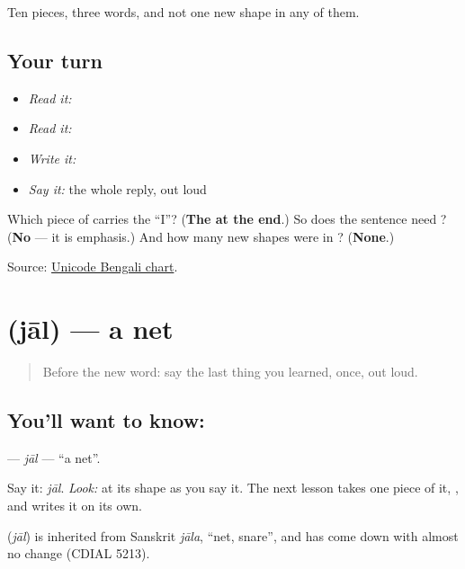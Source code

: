 Ten pieces, three words, and not one new shape in any of them.

\subsection*{Your turn}
\begin{itemize}
\raggedright
  \item \emph{Read it:} 
  \item \emph{Read it:}   
  \item \emph{Write it:} 
  \item \emph{Say it:} the whole reply, out loud
\end{itemize}

\begin{tcolorbox}[breakable,colback=teal!4,colframe=teal!35!black,title={Before you move on}]
Which piece of \textbf{} carries the \textquotedblleft{}I\textquotedblright{}? (\textbf{The  at the end}.) So does the sentence need \textbf{}? (\textbf{No} — it is emphasis.) And how many new shapes were in \textbf{  }? (\textbf{None}.)

Source: \href{https://www.unicode.org/charts/PDF/U0980.pdf}{Unicode Bengali chart}.
\end{tcolorbox}
\section[\texorpdfstring{\bn{জাল} (jāl)}{জাল (jāl)}]{ (jāl) — a net}

\label{lesson:BN-C09-jal}



\begin{quote}
Before the new word: say the last thing you learned, once, out loud.
\end{quote}

\subsection*{You'll want to know: }
\textbf{} — \emph{jāl} — \textquotedblleft{}a net\textquotedblright{}.

Say it: \emph{jāl}. \emph{Look:} at its shape as you say it. The next lesson takes one piece of it, \textbf{}, and writes it on its own.

\begin{cousinweb}
\textbf{} (\emph{jāl}) is inherited from Sanskrit \emph{jāla}, \textquotedblleft{}net, snare\textquotedblright{}, and has come down with almost no change (CDIAL 5213).
\end{cousinweb}

